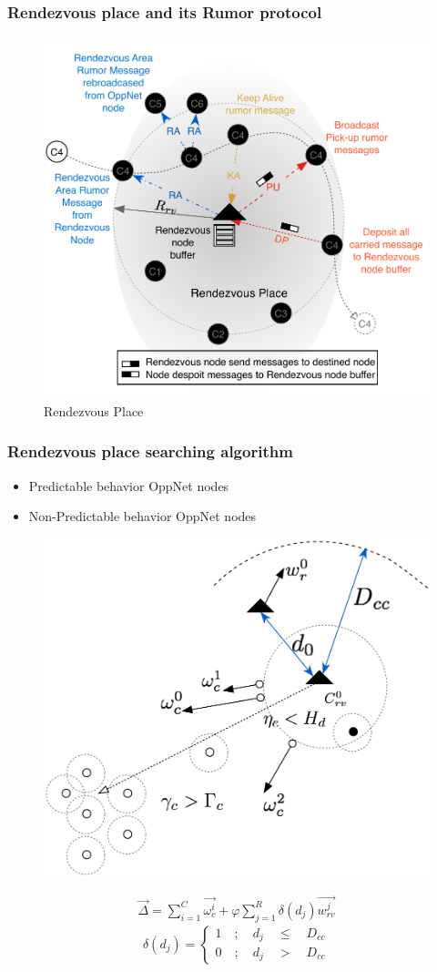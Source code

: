 \documentclass{beamer}
\begin{document}
\begin{frame}
	\frametitle{Rendezvous place and its Rumor protocol}
\begin{figure}
\centering
\includegraphics[width=0.7\linewidth]{Figures/NewRendezvousPlace}
\caption{Rendezvous Place}
\label{fig:NewRendezvousPlace}
\end{figure}
\end{frame}
\begin{frame}
	\frametitle{Rendezvous place searching algorithm}
	\begin{itemize}
		\item Predictable behavior OppNet nodes
		\item Non-Predictable behavior OppNet nodes
	\end{itemize}
\begin{figure}
\centering
\includegraphics[width=0.5\linewidth]{Figures/Dynamic}
\label{fig:Dynamic}
\end{figure}
\tiny{\begin{eqnarray}
\label{DirectionParameter}
\vec{\Delta} =\sum _{ i=1 }^{ C }{ \vec { { \omega }_{ c }^{ i } }  } + \varphi \sum _{ j=1 }^{ R }{ \delta\left( d_{j} \right)
	\vec { {w }_{ rv }^{ j } }  }
\end{eqnarray}}
\tiny{\[\delta \left( { d }_{ j } \right) =\begin{cases} 1\quad ;\quad { d }_{ j }\quad \le { \quad D }_{ cc } \\ 0\quad ;\quad { d }_{ j }\quad >{ \quad D }_{ cc } \end{cases}  \] }


\end{frame}
\end{document}
